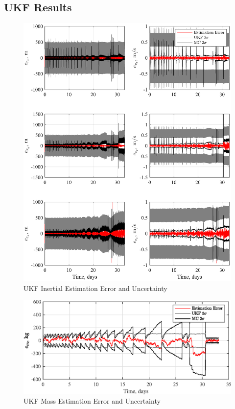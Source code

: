 \documentclass[letterpaper, paper,11pt]{AAS}		%
\begin{document}
\subsection{UKF Results}
\begin{figure}
	\centering 
	\includegraphics{./../../figures/UKFPosVelError.eps}
	\caption{UKF Inertial Estimation Error and Uncertainty}
	\label{fig:UKFposvelerr}
\end{figure}

\begin{figure}
	\centering 
	\includegraphics{./../../figures/UKFMassError.eps}
	\caption{UKF Mass Estimation Error and Uncertainty}
	\label{fig:UKFmasserr}
\end{figure}
\end{document}
